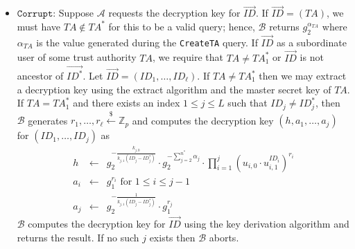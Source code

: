 \documentclass[10pt]{llncs}
\newcommand{\A}{\mathcal{A}}
\newcommand{\B}{\mathcal{B}}
\newcommand{\Zbb}{\mathbb{Z}}
\newcommand{\ID}{\mathit{ID}}
\newcommand{\TA}{\mathit{TA}}
\newcommand{\getsr}{\stackrel{{\scriptscriptstyle\$}}{\gets}}
\begin{document}
\begin{enumerate}
\begin{itemize}
    \item $\texttt{Corrupt}$: Suppose $\A$ requests the decryption key
    for $\vec{\ID}$. If $\vec{\ID} = (\TA)$, we must have
    $\TA \notin \TA^{*}$ for this to be a valid query;
    hence, $\B$ returns $g_{2}^{\alpha_{\TA}}$ where
    $\alpha_{\TA}$ is the value generated during the
    \texttt{CreateTA} query. If $\vec{\ID}$ as a subordinate user of some trust authority $\TA$, we
    require that $\TA\neq \TA^{*}_{1}$ or $\vec{\ID}$ is not
    ancestor of $\vec{\ID^{*}}$. Let
    $\vec{\ID}=(\ID_{1},\ldots,\ID_{\ell})$. If $\TA\neq
    \TA^{*}_{1}$ then we may extract a decryption key using
    the extract algorithm and the master secret key of
    $\TA$. If $\TA=\TA^{*}_{1}$ and there exists an index
    $1\leq j\leq L$ such that $\ID_{j} \neq
    \ID^{*}_{j}$, then $\B$ generates $r_{1},\ldots,r_{\ell}\getsr
    \Zbb_{p}$ and computes the decryption key
    $(h,a_{1},\ldots,a_{j})$ for $(\ID_{1},\ldots,\ID_{j})$
    as
        \begin{eqnarray*}
        h &\gets& g_{2}^{-\frac{k_{j,0}}{k_{j,1}(\ID_{j}-\ID^{*}_{j})}} \cdot g_{2}^{-\sum_{j=2}^{n^{*}}\alpha_{j}}\cdot \prod_{i=1}^{j} \left(u_{i,0}\cdot u_{i,1}^{\ID_{i}}\right)^{r_{i}}\\
        a_{i} &\gets& g_{1}^{r_{i}} \mbox{ for } 1\leq i\leq j-1\\
        a_{j} &\gets& g_{2}^{-\frac{1}{k_{j,1}(\ID_{j}-\ID^{*}_{j})}} \cdot g_{1}^{r_{j}}
        \end{eqnarray*}
        $\B$ computes the decryption key for $\vec{\ID}$ using the key derivation algorithm and returns the result. If no such $j$ exists then $\B$ aborts.


\end{itemize}
\end{enumerate}
\end{document}
